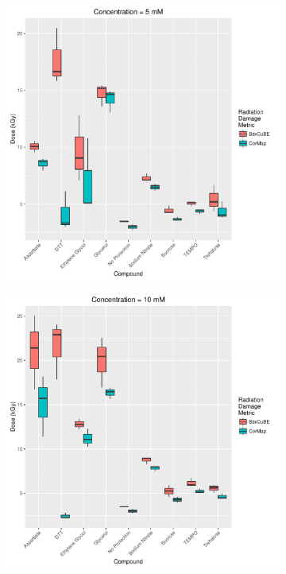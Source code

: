 \begin{figure}
\begin{subfigure}[b]{0.45\textwidth}
            \caption{}
            \label{fig:SAXS Metric comparison - 2mM}
    \end{subfigure}
    \\
    \begin{subfigure}[b]{0.45\textwidth}
            \centering
            \includegraphics[width=\textwidth]{figures/saxs/Conc_5_dose.pdf}
            \caption{}
            \label{fig:SAXS Metric comparison - 5mM}
    \end{subfigure}
    \qquad
    \begin{subfigure}[b]{0.45\textwidth}
            \centering
            \includegraphics[width=\textwidth]{figures/saxs/Conc_10_dose.pdf}

\end{subfigure}
\end{figure}

